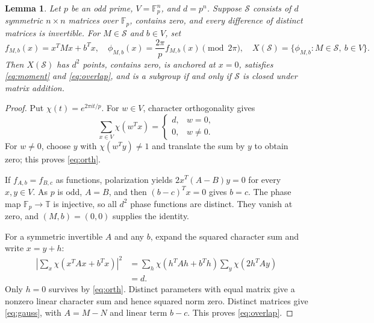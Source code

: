 \documentclass[11pt]{article}
\newtheorem{lemma}[theorem]{Lemma}
\newcommand{\F}{\mathbb F}
\newcommand{\T}{\mathbb T}
\newcommand{\Sset}{\mathcal S}
\begin{document}
\begin{lemma}\label{lem:spread}
Let $p$ be an odd prime, $V=\F_p^n$, and $d=p^n$. Suppose $\Sset$ consists of $d$ symmetric $n\times n$ matrices over $\F_p$, contains zero, and every difference of distinct matrices is invertible. For $M\in\Sset$ and $b\in V$, set
\[
f_{M,b}(x)=x^TMx+b^Tx,\quad
\phi_{M,b}(x)=\frac{2\pi}{p}f_{M,b}(x)\pmod {2\pi},\quad
X(\Sset)=\{\phi_{M,b}:M\in\Sset,\ b\in V\}.
\]
Then $X(\Sset)$ has $d^2$ points, contains zero, is anchored at $x=0$, satisfies \eqref{eq:moment} and \eqref{eq:overlap}, and is a subgroup if and only if $\Sset$ is closed under matrix addition.
\end{lemma}
\begin{proof}
Put $\chi(t)=e^{2\pi i t/p}$. For $w\in V$, character orthogonality gives
\begin{equation}\label{eq:orth}
\sum_{x\in V}\chi(w^Tx)=\begin{cases}d,&w=0,\\0,&w\ne0.\end{cases}
\end{equation}
For $w\ne0$, choose $y$ with $\chi(w^Ty)\ne1$ and translate the sum by $y$ to obtain zero; this proves \eqref{eq:orth}.

If $f_{A,b}=f_{B,c}$ as functions, polarization yields
$2x^T(A-B)y=0$ for every $x,y\in V$. As $p$ is odd, $A=B$, and then $(b-c)^Tx=0$ gives $b=c$. The phase map $\F_p\to\T$ is injective, so all $d^2$ phase functions are distinct. They vanish at zero, and $(M,b)=(0,0)$ supplies the identity.

For a symmetric invertible $A$ and any $b$, expand the squared character sum and write $x=y+h$:
\begin{align}\label{eq:gauss}
\left|\sum_x\chi(x^TAx+b^Tx)\right|^2
&=\sum_h\chi(h^TAh+b^Th)\sum_y\chi(2h^TAy)\\
&=d.\nonumber
\end{align}
Only $h=0$ survives by \eqref{eq:orth}. Distinct parameters with equal matrix give a nonzero linear character sum and hence squared norm zero. Distinct matrices give \eqref{eq:gauss}, with $A=M-N$ and linear term $b-c$. This proves \eqref{eq:overlap}.


\end{proof}
\end{document}
